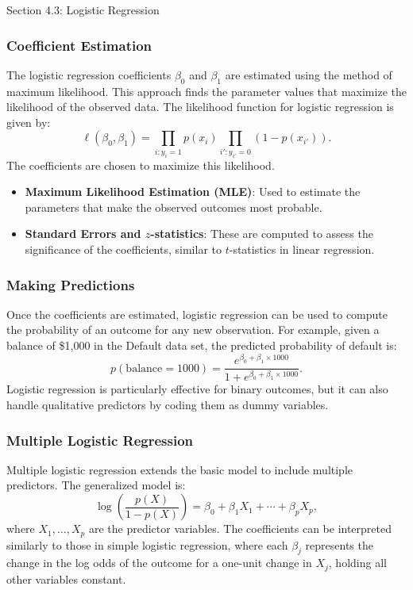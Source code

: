 \begin{notes}{Section 4.3: Logistic Regression}
    \subsubsection*{Coefficient Estimation}
    
    The logistic regression coefficients $\beta_0$ and $\beta_1$ are estimated using the method of maximum likelihood. This approach finds the parameter values that maximize the likelihood of the 
    observed data. The likelihood function for logistic regression is given by:
    \[
    \ell(\beta_0, \beta_1) = \prod_{i:y_i=1} p(x_i) \prod_{i':y_{i'}=0} (1 - p(x_{i'})).
    \]
    The coefficients are chosen to maximize this likelihood.
    
    \begin{highlight}
        \begin{itemize}
            \item \textbf{Maximum Likelihood Estimation (MLE)}: Used to estimate the parameters that make the observed outcomes most probable.
            \item \textbf{Standard Errors and $z$-statistics}: These are computed to assess the significance of the coefficients, similar to $t$-statistics in linear regression.
        \end{itemize}
    \end{highlight}
    
    \subsubsection*{Making Predictions}
    
    Once the coefficients are estimated, logistic regression can be used to compute the probability of an outcome for any new observation. For example, given a balance of \$1,000 in the Default data 
    set, the predicted probability of default is:
    \[
    p(\text{balance} = 1000) = \frac{e^{\beta_0 + \beta_1 \times 1000}}{1 + e^{\beta_0 + \beta_1 \times 1000}}.
    \]
    Logistic regression is particularly effective for binary outcomes, but it can also handle qualitative predictors by coding them as dummy variables.
    
    \subsubsection*{Multiple Logistic Regression}
    
    Multiple logistic regression extends the basic model to include multiple predictors. The generalized model is:
    \[
    \log\left(\frac{p(X)}{1 - p(X)}\right) = \beta_0 + \beta_1 X_1 + \cdots + \beta_p X_p,
    \]
    where $X_1, \dots, X_p$ are the predictor variables. The coefficients can be interpreted similarly to those in simple logistic regression, where each $\beta_j$ represents the change in the log 
    odds of the outcome for a one-unit change in $X_j$, holding all other variables constant.
    

\end{notes}
